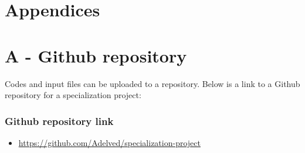 \chapter*{\LARGE \textbf{Appendices}}
\fancyhf{} %
\renewcommand{\headrulewidth}{0pt} %
\fancyfoot[C]{\thepage} %

\appendix


\chapter*{A - Github repository}

Codes and input files can be uploaded to a repository. Below is a link to a Github repository for a specialization project:


\subsection*{Github repository link}
\begin{itemize}
    \item \url{https://github.com/Adelved/specialization-project}
\end{itemize}



